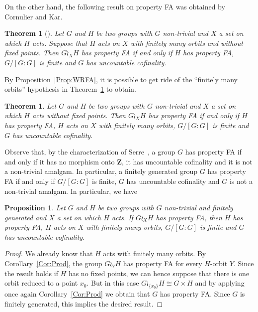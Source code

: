 \documentclass[a4paper]{article}
\newtheorem{prop}[lem]{Proposition}
\newtheorem{thm}[lem]{Theorem}
\theoremstyle{definition}
\theoremstyle{remark}%
\newcommand*{\field}[1]{\mathbf{#1}}
\newcommand*{\Z}{\field{Z}}
\begin{document}
%
%
On the other hand, the following result on property FA  was obtained by Cornulier and Kar.
%
%
\begin{thm}[\cite{Cornulier2011}]\label{Thm:FACK}
Let $G$ and $H$ be two groups with $G$ non-trivial and $X$ a set on which $H$ acts. Suppose that $H$ acts on $X$ with finitely many orbits and without fixed points.
Then $G\wr_XH$ has property FA if and only if $H$ has property FA, $G/[G:G]$ is finite and $G$ has uncountable cofinality.
\end{thm}
%
%
By Proposition~\ref{Prop:WRFA}, it is possible to get ride of the ``finitely many orbits'' hypothesis in Theorem~\ref{Thm:FACK} to obtain.
%
%
\begin{thm}\label{Thm:FACKPlus}
Let $G$ and $H$ be two groups with $G$ non-trivial and $X$ a set on which $H$ acts without fixed points.
Then $G\wr_XH$ has property FA if and only if $H$ has property FA, $H$ acts on $X$ with finitely many orbits, $G/[G:G]$ is finite and $G$ has uncountable cofinality.
\end{thm}

Observe that, by the characterization of Serre~\cite{MR0476875}, a group $G$ has property FA if and only if it has no morphism onto $\Z$, it has uncountable cofinality and it is not a non-trivial amalgam. In particular, a finitely generated group $G$ has property FA if and only if $G/[G:G]$ is finite, $G$ has uncountable cofinality and $G$ is not a non-trivial amalgam.
In particular, we have
\begin{prop}
Let $G$ and $H$ be two groups with $G$ non-trivial and finitely generated and $X$ a set on which $H$ acts.
If $G\wr_XH$ has property FA, then $H$ has property FA, $H$ acts on $X$ with finitely many orbits, $G/[G:G]$ is finite and $G$ has uncountable cofinality.
\end{prop}
\begin{proof}
We already know that $H$ acts with finitely many orbits.
By Corollary~\ref{Cor:Prod}, the group $G\wr_YH$ has property FA for every $H$-orbit $Y$.
Since the result holds if $H$ has no fixed points, we can hence suppose that there is one orbit reduced to a point $x_0$.
But in this case $G\wr_{\{x_0\}}H\cong G\times H$ and by applying once again Corollary~\ref{Cor:Prod} we obtain that $G$ has property FA. Since $G$ is finitely generated, this implies the desired result.
\end{proof}
%
%
%
%
%
%
%
%
%
%
\end{document}
